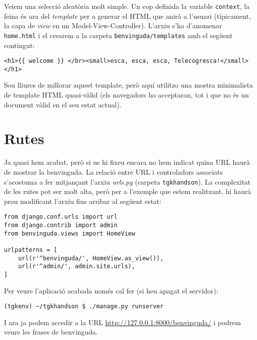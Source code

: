 \documentclass[11pt,a4paper]{article}
\begin{document}
Veiem una selecció aleatòria molt simple. Un cop definida la variable \verb+context+, la feina és ara del \emph{template} per a generar el HTML que anirà a l'usuari (típicament, la capa de \emph{view} en un Model-View-Controller). L'arxiu s'ha d'anomenar \verb+home.html+ i el crearem a la carpeta \verb+benvinguda/templates+ amb el següent contingut:

\begin{verbatim}
<h1>{{ welcome }} </br><small>esca, esca, esca, Telecogresca!</small></h1>
\end{verbatim}

Sou lliures de millorar aquest template, però aquí utilitzo una mostra minimalista de template HTML quasi-vàlid (els navegadors ho acceptaran, tot i que no és un document vàlid en el seu estat actual).

\section{Rutes}

Ja quasi hem acabat, però si us hi fixeu encara no hem indicat quina URL haurà de mostrar la benvinguda. La relació entre URL i controladors associats s'acostuma a fer mitjançant l'arxiu \emph{urls.py} (carpeta \verb+tgkhandson+). La complexitat de les rutes pot ser molt alta, però per a l'exemple que estem realitzant, hi haurà prou modificant l'arxiu fins arribar al següent estat:

\begin{lstlisting}
from django.conf.urls import url
from django.contrib import admin
from benvinguda.views import HomeView

urlpatterns = [
    url(r'^benvinguda/', HomeView.as_view()),
    url(r'^admin/', admin.site.urls),
]
\end{lstlisting}

Per veure l'aplicació acabada només cal fer (si heu apagat el servidor):
\begin{verbatim}
(tgkenv) ~/tgkhandson $ ./manage.py runserver
\end{verbatim}

I ara ja podem accedir a la URL \url{http://127.0.0.1:8000/benvinguda/} i podrem veure les frases de benvinguda.
\end{document}
